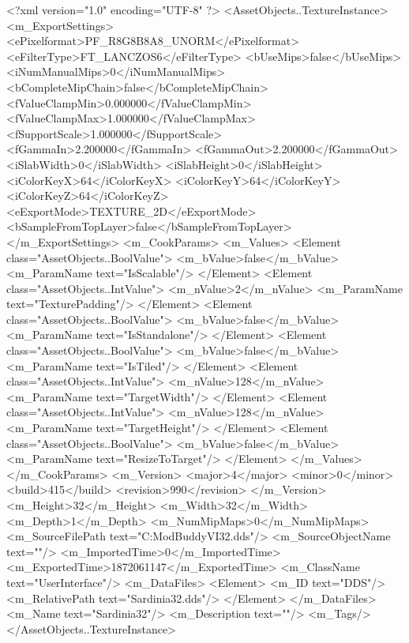 <?xml version="1.0" encoding="UTF-8" ?>
<AssetObjects..TextureInstance>
	<m_ExportSettings>
		<ePixelformat>PF_R8G8B8A8_UNORM</ePixelformat>
		<eFilterType>FT_LANCZOS6</eFilterType>
		<bUseMips>false</bUseMips>
		<iNumManualMips>0</iNumManualMips>
		<bCompleteMipChain>false</bCompleteMipChain>
		<fValueClampMin>0.000000</fValueClampMin>
		<fValueClampMax>1.000000</fValueClampMax>
		<fSupportScale>1.000000</fSupportScale>
		<fGammaIn>2.200000</fGammaIn>
		<fGammaOut>2.200000</fGammaOut>
		<iSlabWidth>0</iSlabWidth>
		<iSlabHeight>0</iSlabHeight>
		<iColorKeyX>64</iColorKeyX>
		<iColorKeyY>64</iColorKeyY>
		<iColorKeyZ>64</iColorKeyZ>
		<eExportMode>TEXTURE_2D</eExportMode>
		<bSampleFromTopLayer>false</bSampleFromTopLayer>
	</m_ExportSettings>
	<m_CookParams>
		<m_Values>
			<Element class="AssetObjects..BoolValue">
				<m_bValue>false</m_bValue>
				<m_ParamName text="IsScalable"/>
			</Element>
			<Element class="AssetObjects..IntValue">
				<m_nValue>2</m_nValue>
				<m_ParamName text="TexturePadding"/>
			</Element>
			<Element class="AssetObjects..BoolValue">
				<m_bValue>false</m_bValue>
				<m_ParamName text="IsStandalone"/>
			</Element>
			<Element class="AssetObjects..BoolValue">
				<m_bValue>false</m_bValue>
				<m_ParamName text="IsTiled"/>
			</Element>
			<Element class="AssetObjects..IntValue">
				<m_nValue>128</m_nValue>
				<m_ParamName text="TargetWidth"/>
			</Element>
			<Element class="AssetObjects..IntValue">
				<m_nValue>128</m_nValue>
				<m_ParamName text="TargetHeight"/>
			</Element>
			<Element class="AssetObjects..BoolValue">
				<m_bValue>false</m_bValue>
				<m_ParamName text="ResizeToTarget"/>
			</Element>
		</m_Values>
	</m_CookParams>
	<m_Version>
		<major>4</major>
		<minor>0</minor>
		<build>415</build>
		<revision>990</revision>
	</m_Version>
	<m_Height>32</m_Height>
	<m_Width>32</m_Width>
	<m_Depth>1</m_Depth>
	<m_NumMipMaps>0</m_NumMipMaps>
	<m_SourceFilePath text="C:\Users\User\Documents\Firaxis ModBuddy\Civilization VI\Italy\Italy\Textures\Sardinia32.dds"/>
	<m_SourceObjectName text=""/>
	<m_ImportedTime>0</m_ImportedTime>
	<m_ExportedTime>1872061147</m_ExportedTime>
	<m_ClassName text="UserInterface"/>
	<m_DataFiles>
		<Element>
			<m_ID text="DDS"/>
			<m_RelativePath text="Sardinia32.dds"/>
		</Element>
	</m_DataFiles>
	<m_Name text="Sardinia32"/>
	<m_Description text=""/>
	<m_Tags/>
</AssetObjects..TextureInstance>

